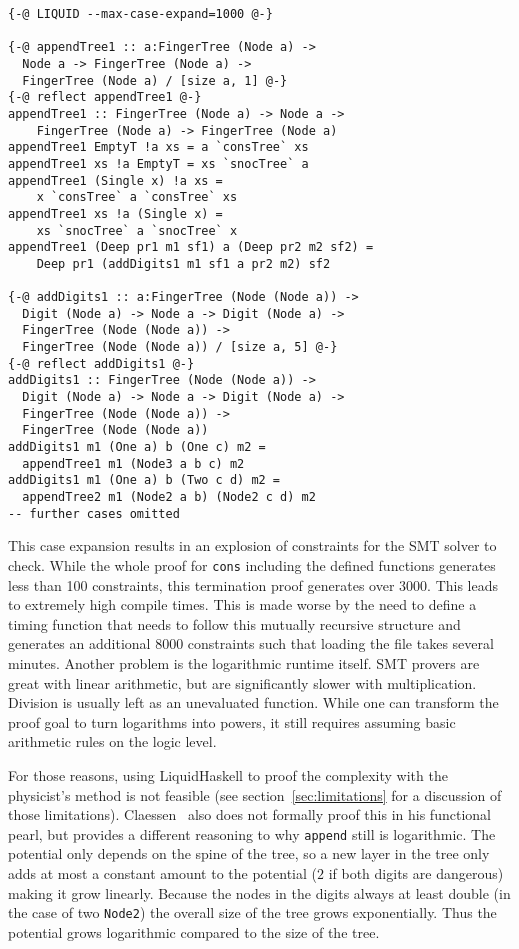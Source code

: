 \documentclass[sigplan,screen]{acmart}
\begin{document}
\begin{lstlisting}
{-@ LIQUID --max-case-expand=1000 @-}

{-@ appendTree1 :: a:FingerTree (Node a) ->
  Node a -> FingerTree (Node a) ->
  FingerTree (Node a) / [size a, 1] @-}
{-@ reflect appendTree1 @-}
appendTree1 :: FingerTree (Node a) -> Node a ->
    FingerTree (Node a) -> FingerTree (Node a)
appendTree1 EmptyT !a xs = a `consTree` xs
appendTree1 xs !a EmptyT = xs `snocTree` a
appendTree1 (Single x) !a xs =
    x `consTree` a `consTree` xs
appendTree1 xs !a (Single x) =
    xs `snocTree` a `snocTree` x
appendTree1 (Deep pr1 m1 sf1) a (Deep pr2 m2 sf2) =
    Deep pr1 (addDigits1 m1 sf1 a pr2 m2) sf2

{-@ addDigits1 :: a:FingerTree (Node (Node a)) ->
  Digit (Node a) -> Node a -> Digit (Node a) ->
  FingerTree (Node (Node a)) ->
  FingerTree (Node (Node a)) / [size a, 5] @-}
{-@ reflect addDigits1 @-}
addDigits1 :: FingerTree (Node (Node a)) ->
  Digit (Node a) -> Node a -> Digit (Node a) ->
  FingerTree (Node (Node a)) ->
  FingerTree (Node (Node a))
addDigits1 m1 (One a) b (One c) m2 =
  appendTree1 m1 (Node3 a b c) m2
addDigits1 m1 (One a) b (Two c d) m2 =
  appendTree2 m1 (Node2 a b) (Node2 c d) m2
-- further cases omitted
\end{lstlisting}

This case expansion results in an explosion of constraints for the SMT solver to check. While the whole proof for \texttt{cons} including the defined functions generates less than 100 constraints, this termination proof generates over 3000. This leads to extremely high compile times. This is made worse by the need to define a timing function that needs to follow this mutually recursive structure and generates an additional 8000 constraints such that loading the file takes several minutes. Another problem is the logarithmic runtime itself. SMT provers are great with linear arithmetic, but are significantly slower with multiplication. Division is usually left as an unevaluated function. While one can transform the proof goal to turn logarithms into powers, it still requires assuming basic arithmetic rules on the logic level.

For those reasons, using LiquidHaskell to proof the complexity with the physicist's method is not feasible (see section~\ref{sec:limitations} for a discussion of those limitations). Claessen~\cite{fingertrees_new} also does not formally proof this in his functional pearl, but provides a different reasoning to why \texttt{append} still is logarithmic. The potential only depends on the spine of the tree, so a new layer in the tree only adds at most a constant amount to the potential ($2$ if both digits are dangerous) making it grow linearly. Because the nodes in the digits always at least double (in the case of two \texttt{Node2}) the overall size of the tree grows exponentially. Thus the potential grows logarithmic compared to the size of the tree.
\end{document}
